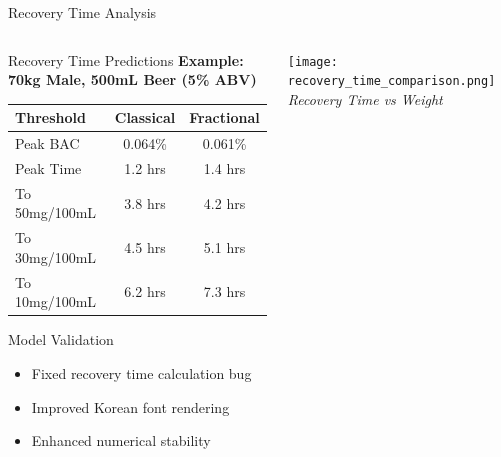 \documentclass[aspectratio=169]{beamer}
\begin{document}
\begin{frame}{Recovery Time Analysis}
    \begin{columns}
        \begin{column}{0.6\textwidth}
            \begin{block}{Recovery Time Predictions}
                \textbf{Example: 70kg Male, 500mL Beer (5\% ABV)}
                
                \begin{tabular}{lcc}
                    \toprule
                    Threshold & Classical & Fractional \\
                    \midrule
                    Peak BAC & 0.064\% & 0.061\% \\
                    Peak Time & 1.2 hrs & 1.4 hrs \\
                    To 50mg/100mL & 3.8 hrs & 4.2 hrs \\
                    To 30mg/100mL & 4.5 hrs & 5.1 hrs \\
                    To 10mg/100mL & 6.2 hrs & 7.3 hrs \\
                    \bottomrule
                \end{tabular}
            \end{block}
            
            \begin{block}{Model Validation}
                \begin{itemize}
                    \item Fixed recovery time calculation bug
                    \item Improved Korean font rendering
                    \item Enhanced numerical stability
                \end{itemize}
            \end{block}
        \end{column}
        
        \begin{column}{0.4\textwidth}
            \begin{center}
                \texttt{[image: recovery\_time\_comparison.png]}
                \small{\textit{Recovery Time vs Weight}}
            \end{center}
        \end{column}
    \end{columns}
\end{frame}
\end{document}
